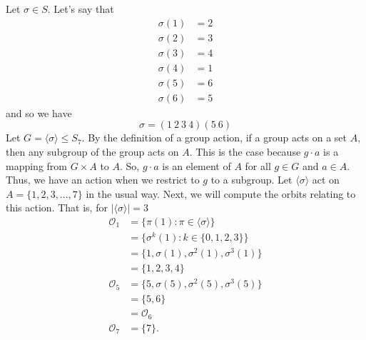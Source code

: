 \begin{eg}
   Let \( \sigma \in S \). Let's say that  
   \begin{align*}
       \sigma(1) &= 2 \\
       \sigma(2) &= 3 \\
       \sigma(3) &= 4 \\
       \sigma(4) &= 1 \\
       \sigma(5) &= 6 \\
       \sigma(6) &= 5
   \end{align*}
   and so we have 
   \[  \sigma = (1 \ 2 \ 3 \ 4 )(5 \ 6) \]
   Let \( G = \langle \sigma  \rangle \leq {S}_{7}  \). By the definition of a group action, if a group acts on a set \( A  \), then any subgroup of the group acts on \( A  \). This is the case because \( g \cdot a  \) is a mapping from \( G \times A  \) to \( A \). So, \( g \cdot a  \) is an element of \( A \) for all \( g \in G  \) and \( a \in A  \). Thus, we have an action when we restrict to \( g  \) to a subgroup. Let \( \langle  \sigma \rangle \) act on \( A = \{  1,2,3,\dots, 7 \}   \) in the usual way. Next, we will compute the orbits relating to this action. That is, for \( | \langle \sigma  \rangle |  = 3 \)
   \begin{align*}
       {\mathcal{O}}_{1} &= \{  \pi(1) : \pi \in \langle \sigma  \rangle \} \\
                         &= \{ \sigma^{k}(1) : k \in \{ 0,1,2,3 \}  \}  \\
                         &= \{ 1 , \sigma(1), \sigma^{2}(1), \sigma^{3}(1) \}  \\
                         &= \{ 1,2,3,4 \} \\
       {\mathcal{O}}_{5} &= \{  5 , \sigma(5), \sigma^{2}(5), \sigma^{3}(5) \}  \\
                         &= \{ 5,6 \} \\
                         &= {\mathcal{O}}_{6} \\
        {\mathcal{O}}_{7} &= \{ 7 \}.
   \end{align*}
\end{eg}

